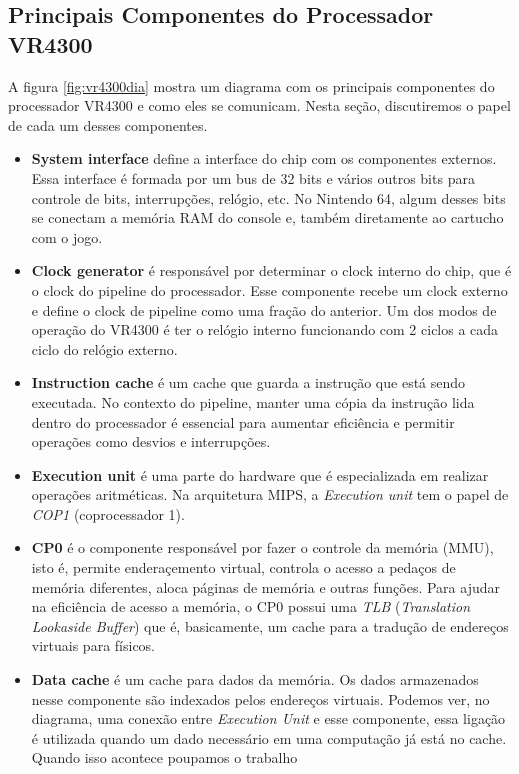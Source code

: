 \documentclass[12pt]{article}
\begin{document}
\subsection{Principais Componentes do Processador VR4300}
    A figura \ref{fig:vr4300dia} mostra um diagrama com os principais
componentes do processador VR4300 e como eles se comunicam. Nesta seção,
discutiremos o papel de cada um desses componentes.
\begin{itemize}
    \item {\bf System interface} define a interface do chip com os
componentes externos. Essa interface é formada por um bus de 32 bits
e vários outros bits para controle de bits, interrupções, relógio, etc.
No Nintendo  64, algum desses bits se conectam a memória RAM do console
e, também diretamente ao cartucho com o jogo.
    \item {\bf Clock generator} é responsável por determinar o clock
interno do chip, que é o clock do pipeline do processador. Esse 
componente recebe um clock externo e define o clock de pipeline como uma
fração do anterior. Um dos modos de operação do VR4300 é ter o relógio 
interno funcionando com 2 ciclos a cada ciclo do relógio externo.
    \item {\bf Instruction cache} é um cache que guarda a instrução que
está sendo executada. No contexto do pipeline, manter uma cópia da 
instrução lida dentro do processador é essencial para aumentar 
eficiência e permitir operações como desvios e interrupções.
    \item {\bf Execution unit} é uma parte do hardware que é 
especializada em realizar operações aritméticas. Na arquitetura MIPS,
a {\em Execution unit} tem o papel de {\em COP1} (coprocessador 1).
    \item {\bf CP0} é o componente responsável por fazer o controle da
memória (MMU), isto é, permite enderaçemento virtual, controla o acesso
a pedaços de memória diferentes, aloca páginas de memória e outras 
funções. Para ajudar na eficiência de acesso a memória, o {\em} CP0 
possui uma {\em TLB} ({\em Translation Lookaside Buffer}) que é, 
basicamente, um cache para a tradução de endereços virtuais para 
físicos.
    \item {\bf Data cache} é um cache para dados da memória. Os dados 
armazenados nesse componente são indexados pelos endereços virtuais.
Podemos ver, no diagrama, uma conexão entre {\em Execution Unit} e esse 
componente, essa ligação é utilizada quando um dado necessário em uma
computação já está no cache. Quando isso acontece poupamos o trabalho

\end{itemize}
\end{document}
